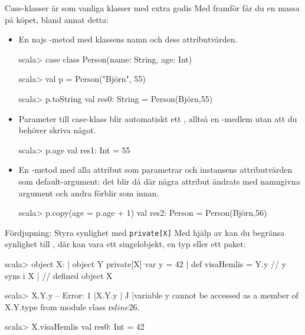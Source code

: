 \begin{Slide}{Case-klasser är som vanliga klasser med extra godis}
\SlideFontTiny
Med  framför  får du en massa  på köpet, bland annat detta:
\begin{itemize}\SlideFontTiny
\item En najs -metod med klassens namn och dess attributvärden.
\begin{REPLsmall}
scala> case class Person(name: String, age: Int)

scala> val p = Person("Björn", 55)

scala> p.toString
val res0: String = Person(Björn,55)

\end{REPLsmall}
\item Parameter till case-klass blir automatiskt ett , alltså en -medlem utan att du behöver skriva något.
\begin{REPLsmall}
scala> p.age
val res1: Int = 55
\end{REPLsmall}
\item En -metod med alla attribut som parametrar och instansens attributvärden som default-argument: det blir då   där några attribut ändrats med namngivna argument och andra förblir som innan.  
\begin{REPLsmall}
scala> p.copy(age = p.age + 1)
val res2: Person = Person(Björn,56)
\end{REPLsmall}
\end{itemize}
\end{Slide}


\begin{Slide}{Fördjupning: Styra synlighet med \texttt{private[X]}}
Med hjälp av  kan du begränsa synlighet till , där  kan vara ett singelobjekt, en typ eller ett paket:
\begin{REPLsmall}
scala> object  X: 
     |   object Y { private[X] var y = 42 }
     |   def visaHemlis = Y.y  // y syns i X
     | 
// defined object X

scala> X.Y.y
-- Error:
1 |X.Y.y
  |^^^^^
  |variable y cannot be accessed as a member of X.Y.type from module class rs$line$26.

scala> X.visaHemlis
val res0: Int = 42

\end{REPLsmall}
\end{Slide}

